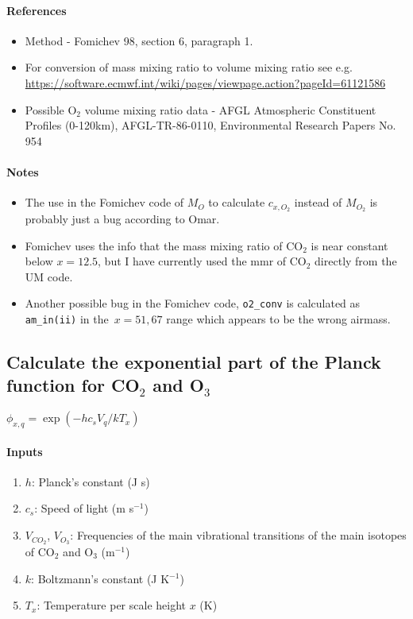    \paragraph{References}
   \begin{itemize}
   \item Method - Fomichev 98, section 6, paragraph 1. 
   \item For conversion of mass mixing ratio to volume mixing ratio see e.g. \\
     \url{https://software.ecmwf.int/wiki/pages/viewpage.action?pageId=61121586}
   \item Possible O$_2$ volume mixing ratio data - AFGL Atmospheric
     Constituent Profiles (0-120km), AFGL-TR-86-0110, Environmental
     Research Papers No. 954
   \end{itemize}

   \paragraph{Notes}
   \begin{itemize}
   \item The use in the Fomichev code of $M_O$ to calculate $c_{x,O_2}$ 
     instead of $M_{O_2}$ is probably just a bug according to Omar.
   \item Fomichev uses the info that the mass mixing ratio of CO$_2$
     is near constant below $x = 12.5$, but I have currently used the 
     mmr of CO$_2$ directly from the UM code.
   \item Another possible bug in the Fomichev code, {\tt o2\_conv} is
     calculated as {\tt am\_in(ii)} in the~$x = 51, 67$ range which appears to be
     the wrong airmass.
   \end{itemize}


\subsection{Calculate the exponential part of the Planck function for 
    CO$_2$ and O$_3$}

   $\phi_{x,q} = \exp(-hc_sV_q/kT_x)$ \\

   \paragraph{Inputs}
   \begin{enumerate}
   \item $h$: Planck's constant (J s)
   \item $c_s$: Speed of light (m s$^{-1}$)
   \item $V_{CO_2}$, $V_{O_3}$: Frequencies of the main vibrational 
     transitions of the main isotopes of CO$_2$ and O$_3$ (m$^{-1}$)
   \item $k$: Boltzmann's constant (J K$^{-1}$)
   \item $T_x$: Temperature per scale height $x$ (K)
   \end{enumerate}

